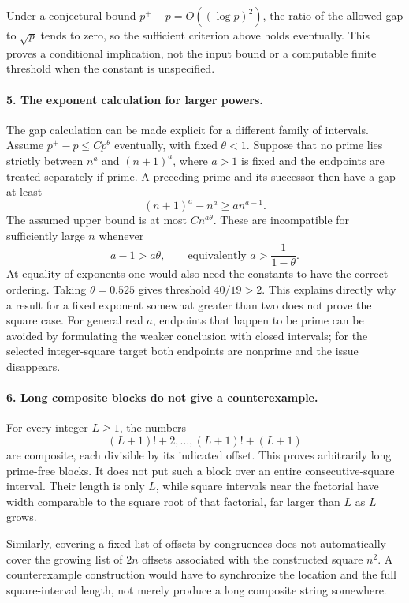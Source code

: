 \documentclass[11pt]{article}
\begin{document}
Under a conjectural bound $p^+-p=O((\log p)^2)$, the ratio of the allowed gap to $\sqrt p$ tends to zero, so the sufficient criterion above holds eventually. This proves a conditional implication, not the input bound or a computable finite threshold when the constant is unspecified.

\paragraph{5. The exponent calculation for larger powers.}
The gap calculation can be made explicit for a different family of intervals. Assume $p^+-p\le C p^\theta$ eventually, with fixed $\theta<1$. Suppose that no prime lies strictly between $n^a$ and $(n+1)^a$, where $a>1$ is fixed and the endpoints are treated separately if prime. A preceding prime and its successor then have a gap at least
\[
 (n+1)^a-n^a\ge a n^{a-1}.
\]
The assumed upper bound is at most $C n^{a\theta}$. These are incompatible for sufficiently large $n$ whenever
\[
 a-1>a\theta,\qquad\text{equivalently }a>\frac1{1-\theta}.
\]
At equality of exponents one would also need the constants to have the correct ordering. Taking $\theta=0.525$ gives threshold $40/19>2$. This explains directly why a result for a fixed exponent somewhat greater than two does not prove the square case. For general real $a$, endpoints that happen to be prime can be avoided by formulating the weaker conclusion with closed intervals; for the selected integer-square target both endpoints are nonprime and the issue disappears.

\paragraph{6. Long composite blocks do not give a counterexample.}
For every integer $L\ge1$, the numbers
\[
 (L+1)!+2,\ldots,(L+1)!+(L+1)
\]
are composite, each divisible by its indicated offset. This proves arbitrarily long prime-free blocks. It does not put such a block over an entire consecutive-square interval. Their length is only $L$, while square intervals near the factorial have width comparable to the square root of that factorial, far larger than $L$ as $L$ grows.

Similarly, covering a fixed list of offsets by congruences does not automatically cover the growing list of $2n$ offsets associated with the constructed square $n^2$. A counterexample construction would have to synchronize the location and the full square-interval length, not merely produce a long composite string somewhere.
\end{document}
